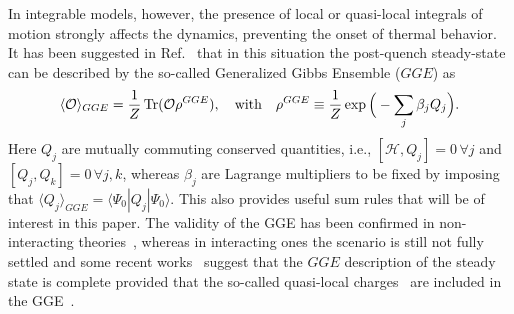 \documentclass[11pt]{iopart}
\begin{document}
In integrable models, however, the presence of local or 
quasi-local integrals of motion strongly affects the dynamics, preventing the 
onset of thermal behavior. It has been suggested in Ref.~\cite{rigol-2007,
rigol-2008} that in this situation the post-quench steady-state can be described 
by the so-called Generalized Gibbs Ensemble ($GGE$) as 
%
\begin{equation}
\label{gge}
\langle{\mathcal O}\rangle_{GGE}=\frac{1}{Z}\mathop{\mathrm{Tr}}\nolimits({\mathcal O}\rho^{GGE}), 
\quad\textrm{with}\quad\rho^{GGE}\equiv\frac{1}{Z}\exp\Big(-\sum_j\beta_jQ_j\Big). 
\end{equation}
%
Here $Q_j$ are mutually commuting conserved quantities, i.e., $[{\mathcal H},Q_j]=0\,
\forall j$ and $[Q_j,Q_k]=0\,\forall j,k$, whereas $\beta_j$ are Lagrange multipliers 
to be fixed by imposing that  $\langle Q_j\rangle_{GGE}=\langle\Psi_0|Q_j|\Psi_0\rangle$. 
This also provides  useful sum rules that will be of interest in this paper. 
The validity of the GGE has been confirmed in non-interacting theories~\cite{calabrese-2006,cramer-2008,barthel-2008,rossini-2009,calabrese-2011,cazalilla-2012,se-12,mossel-2012a,collura-2013,fagotti-2013,kcc14,kcc14a,sotiriadis-2014,bkc-14}, 
whereas in interacting ones the scenario is 
still not fully settled and some recent works~\cite{ilievski-2015a,cardy-2015} suggest that the $GGE$ 
description of the steady state  is complete provided that the so-called quasi-local 
charges~\cite{prosen-2014,pereira-2014,ilievski-2015,essler-2015} are included in the GGE~. 
\end{document}

